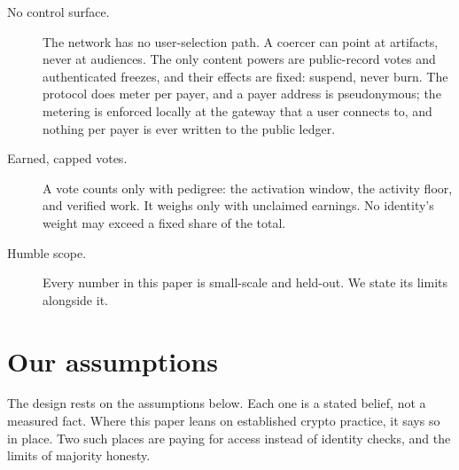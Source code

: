 \documentclass[11pt]{article}
\begin{document}
\begin{description}
    \item[No control surface.] The network has no user-selection
          path. A coercer can point at artifacts, never at audiences. The
          only content powers are public-record votes and authenticated
          freezes, and their effects are fixed: suspend, never burn. The
          protocol does meter per payer, and a payer address is
          pseudonymous; the metering is enforced locally at the gateway that a user
          connects to, and nothing per payer is ever written to the
          public ledger.
    \item[Earned, capped votes.] A vote counts only with pedigree: the
          activation window, the activity floor, and verified work. It
          weighs only with unclaimed earnings. No identity's weight may
          exceed a fixed share of the total.
    \item[Humble scope.] Every number in this paper is small-scale
          and held-out. We state its limits alongside it.
\end{description}

\section{Our assumptions}\label{sec:assumptions}

The design rests on the assumptions below. Each one is a stated
belief, not a measured fact. Where this paper leans on established
crypto practice, it says so in place. Two such places are paying
for access instead of identity checks, and the limits of majority
honesty.
\end{document}
